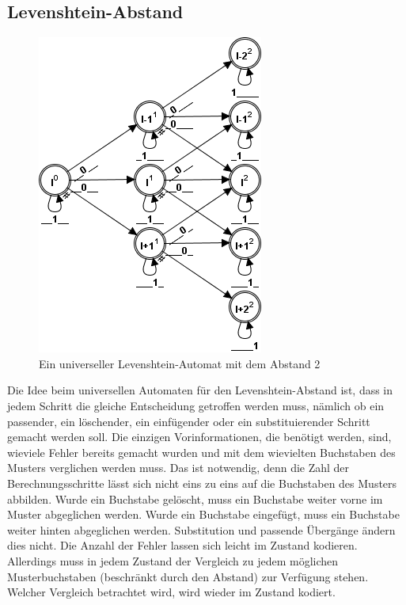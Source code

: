 \subsection{Levenshtein-Abstand}
\begin{figure}[!htb]
\centering
\includegraphics[scale=0.7]{pic/automata/unilevenshtein}%
\caption{Ein universeller Levenshtein-Automat mit dem Abstand 2}%
\end{figure}
Die Idee beim universellen Automaten für den Levenshtein-Abstand ist, dass in jedem Schritt die gleiche Entscheidung getroffen werden muss, nämlich ob ein passender, ein löschender, ein einfügender oder ein substituierender Schritt gemacht werden soll. Die einzigen Vorinformationen, die benötigt werden, sind, wieviele Fehler bereits gemacht wurden und mit dem wievielten Buchstaben des Musters verglichen werden muss. Das ist notwendig, denn die Zahl der Berechnungsschritte lässt sich nicht eins zu eins auf die Buchstaben des Musters abbilden. Wurde ein Buchstabe gelöscht, muss ein Buchstabe weiter vorne im Muster abgeglichen werden. Wurde ein Buchstabe eingefügt, muss ein Buchstabe weiter hinten abgeglichen werden. Substitution und passende Übergänge ändern dies nicht. Die Anzahl der Fehler lassen sich leicht im Zustand kodieren. Allerdings muss in jedem Zustand der Vergleich zu jedem möglichen Musterbuchstaben (beschränkt durch den Abstand) zur Verfügung stehen. Welcher Vergleich betrachtet wird, wird wieder im Zustand kodiert.

